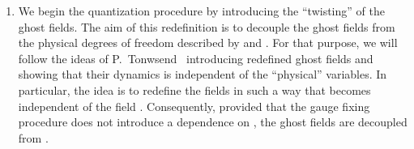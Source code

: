 \documentclass[a4paper,12pt]{article}
\begin{document}
\begin{enumerate}
\item 
We begin the quantization procedure by introducing the ``twisting'' of the 
ghost fields. The aim of this redefinition is to decouple the ghost
fields \coordHE{} from the physical  
degrees of freedom described by  \coordHE{} and \myHighlight{$\theta$}\coordHE{}. For that
purpose, we will  
follow the ideas of P.~Tonwsend~\cite{3lectures} introducing redefined
ghost fields \coordHE{}  
and showing that their dynamics is independent of the ``physical'' variables. 
In particular, the idea is to redefine the fields in such a way that 
\coordHE{} 
becomes independent of the field \myHighlight{$\Phi$}\coordHE{}. Consequently, provided that
the gauge fixing  
procedure does not introduce a dependence on \coordHE{}, the ghost
fields are decoupled from \coordHE{}. 


\end{enumerate}
\end{document}
